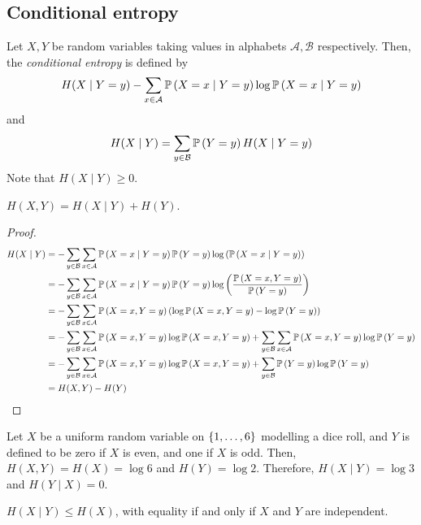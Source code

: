 \subsection{Conditional entropy}
\begin{definition}
    Let \( X, Y \) be random variables taking values in alphabets \( \mathcal A, \mathcal B \) respectively.
    Then, the \emph{conditional entropy} is defined by
    \[ H(X \mid Y = y) - \sum_{x \in \mathcal A} \mathbb{P}\left({X = x \mid Y = y}\right) \log \mathbb{P}\left({X = x \mid Y = y}\right) \]
    and
    \[ H(X \mid Y) = \sum_{y \in \mathcal B} \mathbb{P}\left({Y = y}\right) H(X \mid Y = y) \]
    Note that \( H(X \mid Y) \geq 0 \).
\end{definition}
\begin{lemma}
    \( H(X,Y) = H(X \mid Y) + H(Y) \).
\end{lemma}
\begin{proof}
    \begin{align*}
        H(X \mid Y) &= -\sum_{y \in \mathcal B} \sum_{x \in \mathcal A} \mathbb{P}\left({X = x \mid Y = y}\right) \mathbb{P}\left({Y = y}\right) \log \qty(\mathbb{P}\left({X = x \mid Y = y}\right)) \\
        &= -\sum_{y \in \mathcal B} \sum_{x \in \mathcal A} \mathbb{P}\left({X = x \mid Y = y}\right) \mathbb{P}\left({Y = y}\right) \log \qty(\frac{\mathbb{P}\left({X = x, Y = y}\right)}{\mathbb{P}\left({Y = y}\right)}) \\
        &= -\sum_{y \in \mathcal B} \sum_{x \in \mathcal A} \mathbb{P}\left({X = x, Y = y}\right) \qty(\log \mathbb{P}\left({X = x, Y = y}\right) - \log \mathbb{P}\left({Y = y}\right)) \\
        &= -\sum_{y \in \mathcal B} \sum_{x \in \mathcal A} \mathbb{P}\left({X = x, Y = y}\right) \log \mathbb{P}\left({X = x, Y = y}\right) + \sum_{y \in \mathcal B} \sum_{x \in \mathcal A} \mathbb{P}\left({X = x, Y = y}\right) \log \mathbb{P}\left({Y = y}\right) \\
        &= -\sum_{y \in \mathcal B} \sum_{x \in \mathcal A} \mathbb{P}\left({X = x, Y = y}\right) \log \mathbb{P}\left({X = x, Y = y}\right) + \sum_{y \in \mathcal B} \mathbb{P}\left({Y = y}\right) \log \mathbb{P}\left({Y = y}\right) \\
        &= H(X,Y) - H(Y)
    \end{align*}
\end{proof}
\begin{example}
    Let \( X \) be a uniform random variable on \( \qty{1, \dots, 6} \) modelling a dice roll, and \( Y \) is defined to be zero if \( X \) is even, and one if \( X \) is odd.
    Then, \( H(X,Y) = H(X) = \log 6 \) and \( H(Y) = \log 2 \).
    Therefore, \( H(X \mid Y) = \log 3 \) and \( H(Y \mid X) = 0 \).
\end{example}
\begin{corollary}
    \( H(X\mid Y) \leq H(X) \), with equality if and only if \( X \) and \( Y \) are independent.
\end{corollary}
